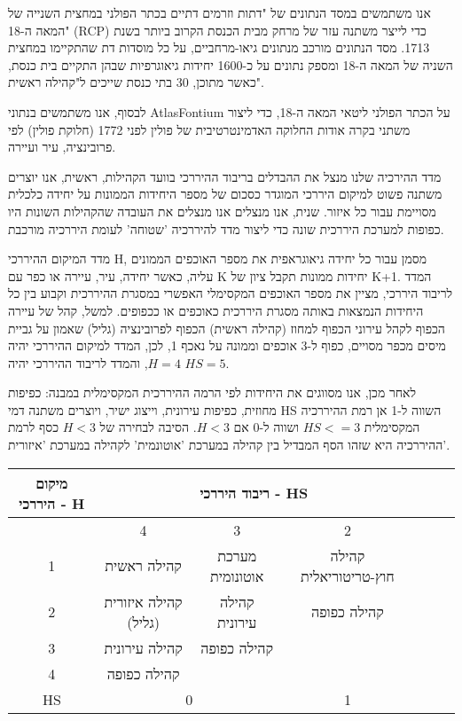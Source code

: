 אנו משתמשים במסד הנתונים של "דתות וזרמים דתיים בכתר הפולני במחצית השנייה של המאה ה-18"  (RCP) \cite{szady_geografia_2023} כדי לייצר משתנה עזר של מרחק מבית הכנסת הקרוב ביותר בשנת 1713. מסד הנתונים מורכב מנתונים גיאו-מרחביים, על כל מוסדות דת שהתקיימו במחצית השניה של המאה ה-18 ומספק נתונים על כ-1600 יחידות גיאוגרפיות שבהן התקיים בית כנסת, כאשר מתוכן, 30 בתי כנסת שייכים ל"קהילה ראשית".

לבסוף, אנו משתמשים בנתוני AtlasFontium  על הכתר הפולני ליטאי המאה ה-18, כדי ליצור משתני בקרה אודות החלוקה האדמינטרטיבית של פולין לפני 1772 (חלוקת פולין) לפי פרובינציה, עיר ועיירה. 

מדד ההירכיה שלנו מנצל את ההבדלים בריבוד ההיררכי בוועד הקהילות, ראשית, אנו יוצרים משתנה פשוט למיקום היררכי המוגדר כסכום של מספר היחידות הממונות על יחידה כלכלית מסויימת עבור כל איזור. שנית, אנו מנצלים אנו מנצלים את העובדה שהקהילות השונות היו כפופות למערכת היררכית שונה כדי ליצור מדד להיררכיה 'שטוחה' לעומת היררכיה מורכבת. 

מדד המיקום ההיררכי H, מסמן עבור כל יחידה גיאוגראפית את מספר האוכפים הממונים עליה, כאשר יחידה, עיר, עיירה או כפר עם K יחידות ממונות תקבל ציון של K+1.
המדד לריבוד היררכי, מציין את מספר האוכפים המקסימלי האפשרי במסגרת ההיררכית וקבוע בין כל היחידות הנמצאות באותה מסגרת היררכית כאוכפים או ככפופים.
למשל, קהל של עיירה הכפוף לקהל עירוני הכפוף למחוז (קהילה ראשית) הכפוף לפרובינציה (גליל) שאמון על גביית מיסים מכפר מסויים, כפוף ל-3 אוכפים וממונה על נאכף 1, לכן, המדד למיקום ההיררכי יהיה $H=4$, והמדד לריבוד ההיררכי יהיה $HS=5$.

לאחר מכן, אנו מסווגים את היחידות לפי הרמה ההיררכית המקסימלית במבנה: כפיפות מחוזית, כפיפות עירונית, וייצוג ישיר, ויוצרים משתנה דמי HS השווה ל-1 אן רמת ההיררכיה המקסימלית $HS<=3$ ושווה ל-0 אם $H<3$. הסיבה לבחירה של $H<3$ כסף לרמת ההיררכיה היא שזהו הסף המבדיל בין קהילה במערכת 'אוטונמית' לקהילה במערכת 'איזורית'. 


\begin{table}[h]
    \centering
    \renewcommand{\arraystretch}{1.4}
    \begin{tabular}{|c| c| c |c|>{\centering\arraybackslash}m{4cm}|>{\centering\arraybackslash}m{4cm}|>{\centering\arraybackslash}m{4cm}|}
   \hline
    \textbf{מיקום היררכי - H} & \multicolumn{3}{c|}{\textbf{ריבוד היררכי - HS}}  \\ \hline
     & 4 & 3 & 2 \\    \hline
    1 & קהילה ראשית & מערכת אוטונומית & קהילה חוץ-טריטוריאלית \\
    
    2 & קהילה איזורית (גליל) & קהילה עירונית & קהילה כפופה \\
    
    3 & קהילה עירונית & קהילה כפופה & \\
    
    4 & קהילה כפופה & & \\
    \hline
    HS & \multicolumn{2}{c}{0} & 1 \\ \hline
\end{tabular}
    \end{table}
        

